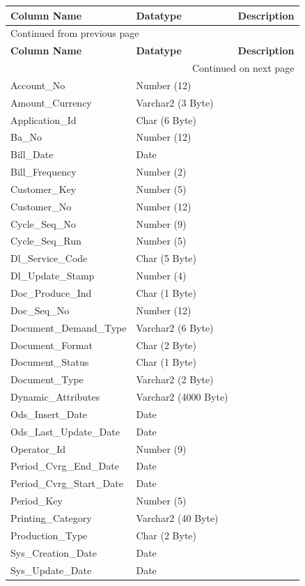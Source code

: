 \documentclass[12pt,twoside]{article}
\begin{document}
\begin{longtable}{l|l|l}
\hline
\textbf{Column Name} & \textbf{Datatype} & \textbf{Description}\\
\hline
\endfirsthead
\multicolumn{3}{l}{Continued from previous page} \\
\hline

\textbf{Column Name} & \textbf{Datatype} & \textbf{Description} \\

\hline
\endhead
\hline\multicolumn{3}{r}{Continued on next page} \\
\endfoot
\endlastfoot
\hline
Account\_No & Number (12) & \\
Amount\_Currency & Varchar2 (3 Byte) & \\
Application\_Id & Char (6 Byte) & \\
Ba\_No & Number (12) & \\
Bill\_Date & Date & \\
Bill\_Frequency & Number (2) & \\
Customer\_Key & Number (5) & \\
Customer\_No & Number (12) & \\
Cycle\_Seq\_No & Number (9) & \\
Cycle\_Seq\_Run & Number (5) & \\
Dl\_Service\_Code & Char (5 Byte) & \\
Dl\_Update\_Stamp & Number (4) & \\
Doc\_Produce\_Ind & Char (1 Byte) & \\
Doc\_Seq\_No & Number (12) & \\
Document\_Demand\_Type & Varchar2 (6 Byte) & \\
Document\_Format & Char (2 Byte) & \\
Document\_Status & Char (1 Byte) & \\
Document\_Type & Varchar2 (2 Byte) & \\
Dynamic\_Attributes & Varchar2 (4000 Byte) & \\
Ods\_Insert\_Date & Date & \\
Ods\_Last\_Update\_Date & Date & \\
Operator\_Id & Number (9) & \\
Period\_Cvrg\_End\_Date & Date & \\
Period\_Cvrg\_Start\_Date & Date & \\
Period\_Key & Number (5) & \\
Printing\_Category & Varchar2 (40 Byte) & \\
Production\_Type & Char (2 Byte) & \\
Sys\_Creation\_Date & Date & \\
Sys\_Update\_Date & Date & \\
\hline
\end{longtable}
\end{document}
